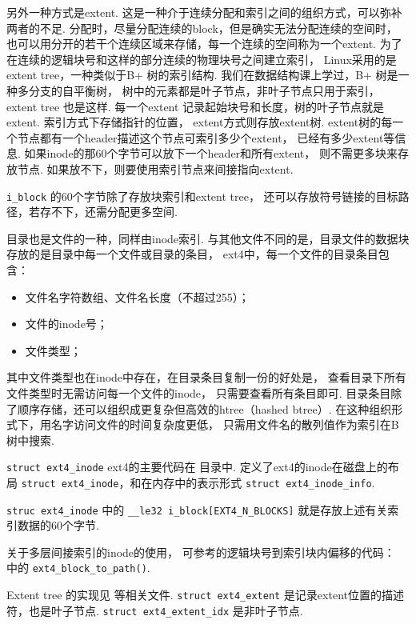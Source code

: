 另外一种方式是extent.
这是一种介于连续分配和索引之间的组织方式，可以弥补两者的不足.
分配时，尽量分配连续的block，但是确实无法分配连续的空间时，
也可以用分开的若干个连续区域来存储，每一个连续的空间称为一个extent. 
为了在连续的逻辑块号和这样的部分连续的物理块号之间建立索引，
Linux采用的是extent tree，一种类似于B+ 树的索引结构.
我们在数据结构课上学过，B+ 树是一种多分支的自平衡树，
树中的元素都是叶子节点，非叶子节点只用于索引，
extent tree 也是这样.
每一个extent 记录起始块号和长度，树的叶子节点就是extent.
索引方式下存储指针的位置，
extent方式则存放extent树.
extent树的每一个节点都有一个header描述这个节点可索引多少个extent，
已经有多少extent等信息.
如果inode的那60个字节可以放下一个header和所有extent，
则不需更多块来存放节点.
如果放不下，则要使用索引节点来间接指向extent.\cite{Ext4Extent}

\lstinline{i_block} 的60个字节除了存放块索引和extent tree，
还可以存放符号链接的目标路径，若存不下，还需分配更多空间.

目录也是文件的一种，同样由inode索引.
与其他文件不同的是，目录文件的数据块存放的是目录中每一个文件或目录的条目，
ext4中，每一个文件的目录条目包含：
\begin{itemize}
	\item 文件名字符数组、文件名长度（不超过255）；
	\item 文件的inode号；
	\item 文件类型；
\end{itemize}
其中文件类型也在inode中存在，在目录条目复制一份的好处是，
查看目录下所有文件类型时无需访问每一个文件的inode，
只需要查看所有条目即可.\cite{ext4dynamic}
目录条目除了顺序存储，还可以组织成更复杂但高效的htree（hashed btree）. 
在这种组织形式下，用名字访问文件的时间复杂度更低，
只需用文件名的散列值作为索引在B树中搜索.

\begin{readsrcbox}{\lstinline{struct ext4_inode}}
	ext4的主要代码在  目录中.
	 定义了ext4的inode在磁盘上的布局 \lstinline{struct ext4_inode}，和在内存中的表示形式 \lstinline{struct ext4_inode_info}.

	\lstinline{struc ext4_inode} 中的
	\lstinline{__le32 i_block[EXT4_N_BLOCKS]}
	就是存放上述有关索引数据的60个字节.

	关于多层间接索引的inode的使用，
	可参考的逻辑块号到索引块内偏移的代码：
	 中的 \lstinline{ext4_block_to_path()}.

	Extent tree 的实现见  等相关文件.
	\lstinline{struct ext4_extent} 是记录extent位置的描述符，也是叶子节点.
	\lstinline{struct ext4_extent_idx} 是非叶子节点.
\end{readsrcbox}

